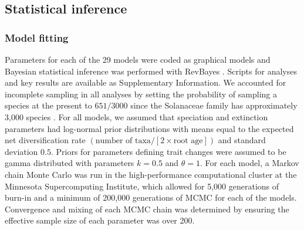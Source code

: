 
\subsection{Statistical inference}

\subsubsection{Model fitting}

Parameters for each of the 29 models were coded as graphical models and Bayesian statistical inference was performed with RevBayes \citep{hoehna_2016}.
Scripts for analyses and key results are available as Supplementary Information. %
We accounted for incomplete sampling in all analyses by setting the probability of sampling a species at the present to $651/3000$ \citep[using the method of][]{fitzjohn_2009} since the Solanaceae family has approximately 3,000 species \citep{solsource}.
For all models, we assumed that speciation and extinction parameters had log-normal prior distributions with means equal to the expected net diversification rate $(\text{number of taxa} / [2 \times \text{root age}])$ and standard deviation $0.5$.
Priors for parameters defining trait changes were assumed to be gamma distributed with parameters $k=0.5$ and $\theta=1$. 
For each model, a Markov chain Monte Carlo \citep[MCMC;][]{metropolis1953equation,Hastings1970} was run in the high-performance computational cluster at the Minnesota Supercomputing Institute, which allowed for 5,000 generations of burn-in and a minimum of 200,000 generations of MCMC for each of the models.
Convergence and mixing of each MCMC chain was determined by ensuring the effective sample size of each parameter was over 200.

